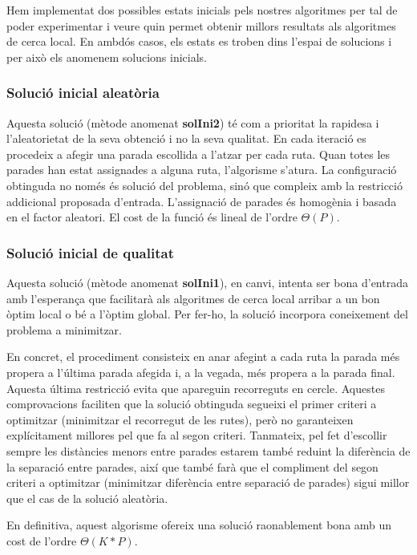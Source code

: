 
Hem implementat dos possibles estats inicials pels nostres algoritmes per tal de poder experimentar i veure quin permet obtenir millors resultats als algoritmes de cerca local. En ambdós casos, els estats es troben dins l'espai de solucions i per això els anomenem solucions inicials.

\subsubsection{Solució inicial aleatòria}

Aquesta solució (mètode anomenat \textbf{solIni2}) té com a prioritat la rapidesa i l'aleatorietat de la seva obtenció i no la seva qualitat. En cada iteració es procedeix a afegir una parada escollida a l'atzar per cada ruta. Quan totes les parades han estat assignades a alguna ruta, l'algorisme s'atura. La configuració obtinguda no només és solució del problema, sinó que compleix amb la restricció addicional proposada d'entrada. L'assignació de parades és homogènia i basada en el factor aleatori. El cost de la funció és lineal de l'ordre $\Theta(P)$.

\subsubsection{Solució inicial de qualitat}

Aquesta solució (mètode anomenat \textbf{solIni1}), en canvi, intenta ser bona d'entrada amb l'esperança que facilitarà als algoritmes de cerca local arribar a un bon òptim local o bé a l'òptim global. Per fer-ho, la solució incorpora coneixement del problema a minimitzar. 

En concret, el procediment consisteix en anar afegint a cada ruta la parada més propera a l'última parada afegida i, a la vegada, més propera a la parada final. Aquesta última restricció evita que apareguin recorreguts en cercle. Aquestes comprovacions faciliten que la solució obtinguda segueixi el primer criteri a optimitzar (minimitzar el recorregut de les rutes), però no garanteixen explícitament millores pel que fa al segon criteri. Tanmateix, pel fet d'escollir sempre les distàncies menors entre parades estarem també reduint la diferència de la separació entre parades, així que també farà que el compliment del segon criteri a optimitzar (minimitzar diferència entre separació de parades) sigui millor que el cas de la solució aleatòria.

En definitiva, aquest algorisme ofereix una solució raonablement bona amb un cost de l'ordre $\Theta(K * P)$.


